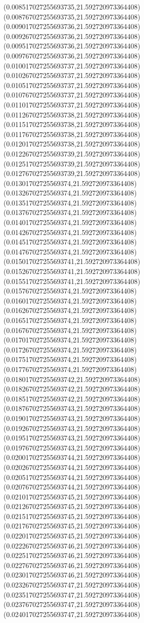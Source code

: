 {(0.008517027255693735,21.592720973364408)
(0.008767027255693735,21.592720973364408)
(0.009017027255693736,21.592720973364408)
(0.009267027255693736,21.592720973364408)
(0.009517027255693736,21.592720973364408)
(0.009767027255693736,21.592720973364408)
(0.010017027255693737,21.592720973364408)
(0.010267027255693737,21.592720973364408)
(0.010517027255693737,21.592720973364408)
(0.010767027255693737,21.592720973364408)
(0.011017027255693737,21.592720973364408)
(0.011267027255693738,21.592720973364408)
(0.011517027255693738,21.592720973364408)
(0.011767027255693738,21.592720973364408)
(0.012017027255693738,21.592720973364408)
(0.012267027255693739,21.592720973364408)
(0.012517027255693739,21.592720973364408)
(0.012767027255693739,21.592720973364408)
(0.01301702725569374,21.592720973364408)
(0.01326702725569374,21.592720973364408)
(0.01351702725569374,21.592720973364408)
(0.01376702725569374,21.592720973364408)
(0.01401702725569374,21.592720973364408)
(0.01426702725569374,21.592720973364408)
(0.01451702725569374,21.592720973364408)
(0.01476702725569374,21.592720973364408)
(0.015017027255693741,21.592720973364408)
(0.015267027255693741,21.592720973364408)
(0.015517027255693741,21.592720973364408)
(0.01576702725569374,21.592720973364408)
(0.01601702725569374,21.592720973364408)
(0.01626702725569374,21.592720973364408)
(0.01651702725569374,21.592720973364408)
(0.01676702725569374,21.592720973364408)
(0.01701702725569374,21.592720973364408)
(0.01726702725569374,21.592720973364408)
(0.01751702725569374,21.592720973364408)
(0.01776702725569374,21.592720973364408)
(0.018017027255693742,21.592720973364408)
(0.018267027255693742,21.592720973364408)
(0.018517027255693742,21.592720973364408)
(0.018767027255693743,21.592720973364408)
(0.019017027255693743,21.592720973364408)
(0.019267027255693743,21.592720973364408)
(0.019517027255693743,21.592720973364408)
(0.019767027255693743,21.592720973364408)
(0.020017027255693744,21.592720973364408)
(0.020267027255693744,21.592720973364408)
(0.020517027255693744,21.592720973364408)
(0.020767027255693744,21.592720973364408)
(0.021017027255693745,21.592720973364408)
(0.021267027255693745,21.592720973364408)
(0.021517027255693745,21.592720973364408)
(0.021767027255693745,21.592720973364408)
(0.022017027255693745,21.592720973364408)
(0.022267027255693746,21.592720973364408)
(0.022517027255693746,21.592720973364408)
(0.022767027255693746,21.592720973364408)
(0.023017027255693746,21.592720973364408)
(0.023267027255693747,21.592720973364408)
(0.023517027255693747,21.592720973364408)
(0.023767027255693747,21.592720973364408)
(0.024017027255693747,21.592720973364408)
}

